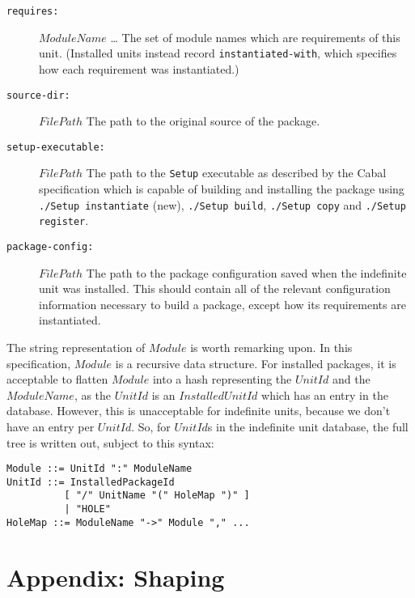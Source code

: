 \documentclass{article}
\newcommand{\I}[1]{\ensuremath{\mathit{#1}}}
\begin{document}
\begin{description}
    \item[\texttt{requires:}] \I{ModuleName} \ldots \newline
        The set of module names which are requirements of this unit.
        (Installed units instead record \texttt{instantiated-with}, which
        specifies how each requirement was instantiated.)
    \item[\texttt{source-dir:}] \I{FilePath} \newline
        The path to the original source of the package.
    \item[\texttt{setup-executable:}] \I{FilePath} \newline
        The path to the \texttt{Setup} executable as described by the Cabal
        specification which is capable of building and installing the package
        using \texttt{./Setup instantiate} (new),
        \texttt{./Setup build}, \texttt{./Setup copy} and
        \texttt{./Setup register}.
    \item[\texttt{package-config:}] \I{FilePath} \newline
        The path to the package configuration saved when the indefinite
        unit was installed.  This should contain all of the relevant configuration
        information necessary to build a package, except how its requirements
        are instantiated.
\end{description}
%
The string representation of \I{Module} is worth remarking upon.  In
this specification, \I{Module} is a recursive data structure.  For
installed packages, it is acceptable to flatten \I{Module} into a
hash representing the \I{UnitId} and the \I{ModuleName}, as the \I{UnitId}
is an \I{InstalledUnitId} which has an entry in the database.  However,
this is unacceptable for indefinite units, because we don't have an
entry per \I{UnitId}.  So, for \I{UnitId}s in the indefinite unit database,
the full tree is written out, subject to this syntax:

\begin{verbatim}
Module ::= UnitId ":" ModuleName
UnitId ::= InstalledPackageId
          [ "/" UnitName "(" HoleMap ")" ]
          | "HOLE"
HoleMap ::= ModuleName "->" Module "," ...
\end{verbatim}

\section{Appendix: Shaping}
\end{document}
